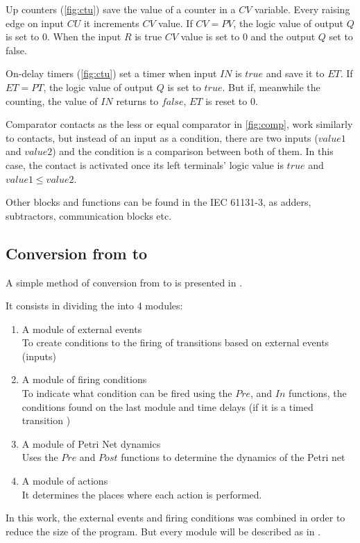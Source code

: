 Up counters (\autoref{fig:ctu}) save the value of a counter in a $CV$ variable. Every raising edge
on input $CU$ it increments $CV$ value. If $CV=PV$, the logic value of output $Q$ 
is set to $0$. When the input $R$ is true $CV$ value is set to $0$ and the
output $Q$ set to false.

On-delay timers (\autoref{fig:ctu}) set a timer when input $IN$ is $true$
and save it to $ET$. If $ET=PT$, the logic value of output $Q$ is set to $true$.
But if, meanwhile the counting, the value of $IN$ returns to $false$, $ET$ is reset to
$0$.

Comparator contacts as the less or equal comparator in \autoref{fig:comp}, work
similarly to contacts, but instead of an input as a condition, there are two
inputs ($value1$ and $value2$) and the condition is a comparison between both of
them. In this case, the contact is activated once its left terminals' logic
value is $true$ and $value1\leq value2$.

Other blocks and functions can be found in the IEC 61131-3, as adders,
subtractors, communication blocks etc.

\subsection{Conversion from \CIPN{} to \LD}
\label{sec:cipnToLD}

A simple method of conversion from \CIPN{} to \LD{} is presented in
\cite{moreira2013bridging}.

It consists in dividing the \CIPN{} into 4 modules:
\begin{enumerate}
\item A module of external events\\
  To create conditions to the firing of transitions based on external events
  (inputs)
\item A module of firing conditions\\
  To indicate what condition can be fired using the $Pre$, and $In$ functions, the conditions found on the
  last module and time delays (if it is a timed transition 
  )
\item A module of Petri Net dynamics\\
Uses the $Pre$ and $Post$ functions to determine the dynamics of the Petri net
\item A module of actions\\
  It determines the places where each action is performed.
\end{enumerate}
In this work, the external events and firing conditions was combined in order to
reduce the size of the program. But every module will be described as in
\cite{moreira2013bridging}.


